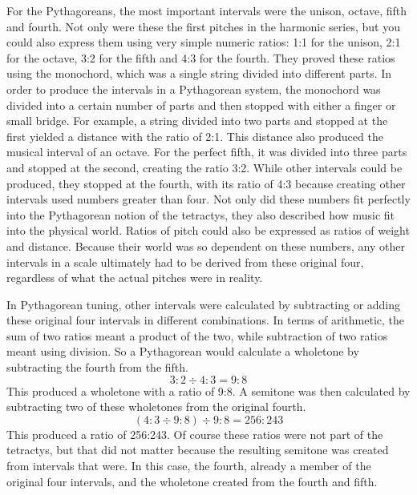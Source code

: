 For the Pythagoreans, the most important intervals were the unison, octave, fifth and
fourth.  Not only were these the first pitches in the harmonic series, but you could also
express them using very simple numeric ratios: 1:1 for the unison, 2:1 for the octave, 3:2
for the fifth and 4:3 for the fourth. They proved these ratios using the monochord, which
was a single string divided into different parts.  In order to
produce the intervals in a Pythagorean system, the monochord was divided into a
certain number of parts and then stopped with either a finger or small bridge.  For
example, a string divided into two parts and stopped at the first yielded
a distance with the ratio of 2:1.  This distance also produced the musical interval of
an octave.  For the perfect fifth, it was divided into three parts and stopped at the
second, creating the ratio 3:2.  While other intervals could be produced, they stopped
at the fourth, with its ratio of 4:3 because creating other intervals used numbers greater
than four.  Not only did these numbers fit perfectly into the
Pythagorean notion of the tetractys, they also described how music fit into the physical
world.  Ratios of pitch could also be expressed as ratios of weight and distance. Because
their world was so dependent on these numbers, any other intervals in a scale ultimately
had to be derived from these original four, regardless of what the actual pitches were in
reality.\autocite[274]{CN:1}

In Pythagorean tuning, other intervals were calculated by subtracting or adding these
original four intervals in different combinations.  In terms of arithmetic, the sum of two
ratios meant a product of the two, while subtraction of two ratios meant using division.
So a Pythagorean would calculate a wholetone by subtracting the fourth from the fifth.
\begin{equation}
3:2 \div 4:3 = 9:8
\end{equation}
This produced a wholetone with a ratio of 9:8. A semitone was then calculated by
subtracting two of these wholetones from the original fourth.
\begin{equation}
    (4:3 \div 9:8) \div 9:8 = 256:243
\end{equation}
This produced a ratio of 256:243. Of course these ratios were not part of the tetractys,
but that did not matter because the resulting semitone was created from intervals that
were.  In this case, the fourth, already a member of the original four intervals, and the
wholetone created from the fourth and fifth.

